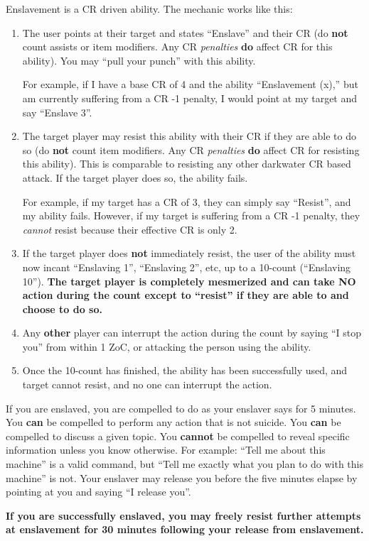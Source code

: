 \documentclass[green]{elementals}
\begin{document}
\name{\gEnslave{}} 

Enslavement is a CR driven ability. The mechanic works like this:

\begin{enumerate}
 \item The user points at their target and states ``Enslave'' and their CR (do {\bf not} count assists or item modifiers. Any CR \emph{penalties} {\bf do} affect CR for this ability). You may ``pull your punch'' with this ability. 
 
 For example, if I have a base CR of 4 and the ability ``Enslavement (x),'' but am currently suffering from a CR -1 penalty, I would point at my target and say ``Enslave 3''. 
 
 \item The target player may resist this ability with their CR if they are able to do so (do {\bf not} count item modifiers. Any CR \emph{penalties} {\bf do} affect CR for resisting this ability). This is comparable to resisting any other darkwater CR based attack. If the target player does so, the ability fails. 
 
 For example, if my target has a CR of 3, they can simply say ``Resist'', and my ability fails.
 However, if my target is suffering from a CR -1 penalty, they \emph{cannot} resist because their effective CR is only 2.
 
 \item If the target player does {\bf not} immediately resist, the user of the ability must now incant ``Enslaving 1'', ``Enslaving 2'', etc, up to a 10-count (``Enslaving 10''). {\bf The target player is completely mesmerized and can take NO action during the count except to ``resist'' if they are able to and choose to do so.}
 
 \item Any {\bf other} player can interrupt the action during the count by saying ``I stop you'' from within 1 ZoC, or attacking the person using the ability.
 
 \item Once the 10-count has finished, the ability has been successfully used, and target cannot resist, and no one can interrupt the action.
\end{enumerate}

If you are enslaved, you are compelled to do as your enslaver says for 5 minutes. You {\bf can} be compelled to perform any action that is not suicide. You {\bf can} be compelled  to discuss a given topic. You {\bf cannot} be compelled to reveal specific information unless you know otherwise. For example: ``Tell me about this machine'' is a valid command, but ``Tell me exactly what you plan to do with this machine'' is not. Your enslaver may release you before the five minutes elapse by pointing at you and saying ``I release you''.

{\bf If you are successfully enslaved, you may freely resist further attempts at enslavement for 30 minutes following your release from enslavement.}
\end{document}
